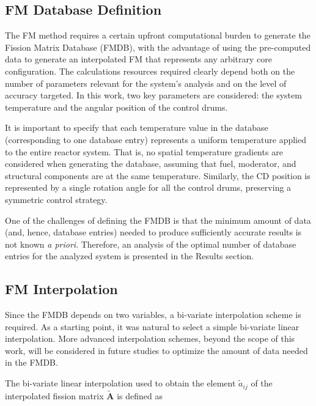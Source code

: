 \documentclass[preprint,review,12pt]{elsarticle}
\begin{document}
\subsection{FM Database Definition} \label{subsection:Database definition}
The FM method requires a certain upfront computational burden to generate the Fission Matrix Database (FMDB), with the advantage of using the pre-computed data to generate an interpolated FM that represents any arbitrary core configuration. The calculations resources required clearly depend both on the number of parameters relevant for the system's analysis and on the level of accuracy targeted.
In this work, two key parameters are considered: the system temperature and the angular position of the control drums.

It is important to specify that each temperature value in the database (corresponding to one database entry) represents a uniform temperature applied to the entire reactor system. That is, no spatial temperature gradients are considered when generating the database, assuming that fuel, moderator, and structural components are at the same temperature. Similarly, the CD position is represented by a single rotation angle for all the control drums, preserving a symmetric control strategy.

One of the challenges of defining the FMDB is that the minimum amount of data (and, hence, database entries) needed to produce sufficiently accurate results is not known \textit{a priori}. Therefore, an analysis of the optimal number of database entries for the analyzed system is presented in the Results section.   

\subsection{FM Interpolation}
Since the FMDB depends on two variables, a bi-variate interpolation scheme is required. As a starting point, it was natural to select a simple bi-variate linear interpolation. More advanced interpolation schemes, beyond the scope of this work, will be considered in future studies to optimize the amount of data needed in the FMDB.

The bi-variate linear interpolation used to obtain the element $\tilde{a}_{ij}$ of the interpolated fission matrix $\tilde{\mathbf{A}}$ is defined as
\end{document}
